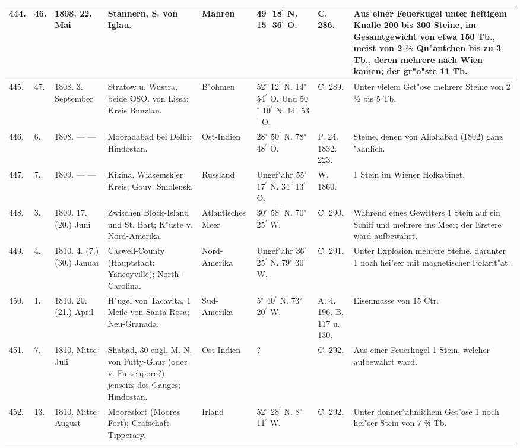 \documentclass[a4paper, 8pt, oneside, polutonikogreek, german]{article}
\begin{document}
\begin{center}
\begin{longtable}{| p{5mm} | p{3mm} | p{15mm} | p{25mm} | p{20mm} | p{14mm} | p{17mm} | p{24mm} |}
        444. & 46. & 1808. 22. Mai & Stannern, S. von Iglau. & Mahren & 49$^\circ$ 18$^\prime$ N. 15$^\circ$ 36$^\prime$ O. & C. 286. & Aus einer Feuerkugel unter heftigem Knalle 200 bis 300 Steine, im Gesamtgewicht von etwa 150 Tb., meist von 2 ½ Qu"antchen bis zu 3 Tb., deren mehrere nach Wien kamen; der gr"o"ste 11 Tb. \\ \hline
        445. & 47. & 1808. 3. September & Stratow u. Wustra, beide OSO. von Lissa; Kreis Bunzlau. & B"ohmen & 52$^\circ$ 12$^\prime$ N. 14$^\circ$ 54$^\prime$ O. Und 50$^\circ$ 10$^\prime$ N. 14$^\circ$ 53$^\prime$ O. & C. 289. & Unter vielem Get"ose mehrere Steine von 2 ½ bis 5 Tb. \\ \hline
        446. & 6. & 1808. --- --- & Mooradabad bei Delhi; Hindostan. & Ost-Indien & 28$^\circ$ 50$^\prime$ N. 78$^\circ$ 48$^\prime$ O. & P. 24. 1832. 223. & Steine, denen von Allahabad (1802) ganz "ahnlich. \\ \hline
        447. & 7. & 1809. --- --- & Kikina, Wiasemsk’er Kreis; Gouv. Smolensk. & Russland & Ungef"ahr 55$^\circ$ 17$^\prime$ N. 34$^\circ$ 13$^\prime$ O. & W. 1860. & 1 Stein im Wiener Hofkabinet. \\ \hline
        448. & 3. & 1809. 17. (20.) Juni & Zwischen Block-Island und St. Bart; K"uste v. Nord-Amerika. & Atlantisches Meer & 30$^\circ$ 58$^\prime$ N. 70$^\circ$ 25$^\prime$ W. & C. 290. & Wahrend eines Gewitters 1 Stein auf ein Schiff und mehrere ins Meer; der Erstere ward aufbewahrt. \\ \hline
        449. & 4. & 1810. 4. (7.) (30.) Januar & Caswell-County (Hauptstadt: Yanceyville); North-Carolina. & Nord-Amerika & Ungef"ahr 36$^\circ$ 25$^\prime$ N. 79$^\circ$ 30$^\prime$ W. & C. 291. & Unter Explosion mehrere Steine, darunter 1 noch hei"ser mit magnetischer Polarit"at. \\ \hline
        450. & 1. & 1810. 20. (21.) April & H"ugel von Tacavita, 1 Meile von Santa-Rosa; Neu-Granada. & Sud-Amerika & 5$^\circ$ 40$^\prime$ N. 73$^\circ$ 20$^\prime$ W. & A. 4. 196. B. 117 u. 130. & Eisenmasse von 15 Ctr. \\ \hline
        451. & 7. & 1810. Mitte Juli & Shabad, 30 engl. M. N. von Futty-Ghur (oder v. Futtehpore?), jenseits des Ganges; Hindostan. & Ost-Indien & ? & C. 292. & Aus einer Feuerkugel 1 Stein, welcher aufbewahrt ward. \\ \hline
        452. & 13. & 1810. Mitte August & Mooresfort (Moores Fort); Grafschaft Tipperary. & Irland & 52$^\circ$ 28$^\prime$ N. 8$^\circ$ 11$^\prime$ W. & C. 292. & Unter donner"ahnlichem Get"ose 1 noch hei"ser Stein von 7 ¾ Tb. \\ \hline

\end{longtable}
\end{center}
\end{document}
